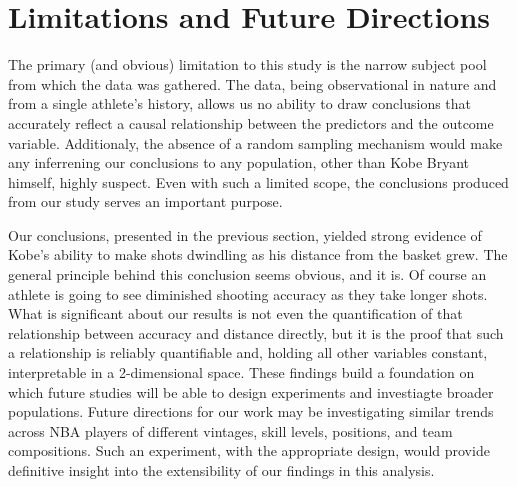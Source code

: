 \chapter{Limitations and Future Directions}\label{chap:discussion}

The primary (and obvious) limitation to this study is the narrow subject pool from which the data was gathered.  The data, being observational in nature and from a single athlete's history, allows us no ability to draw conclusions that accurately reflect a causal relationship between the predictors and the outcome variable. Additionaly, the absence of a random sampling mechanism would make any inferrening our conclusions to any population, other than Kobe Bryant himself, highly suspect.  Even with such a limited scope, the conclusions produced from our study serves an important purpose.  \par

Our conclusions, presented in the previous section, yielded strong evidence of Kobe's ability to make shots dwindling as his distance from the basket grew. The general principle behind this conclusion seems obvious, and it is.  Of course an athlete is going to see diminished shooting accuracy as they take longer shots.  What is significant about our results is not even the quantification of that relationship between accuracy and distance directly, but it is the proof that such a relationship is reliably quantifiable and, holding all other variables constant, interpretable in a 2-dimensional space.  These findings build a foundation on which future studies will be able to design experiments and investiagte broader populations. Future directions for our work may be investigating similar trends across NBA players of different vintages, skill levels, positions, and team compositions.  Such an experiment, with the appropriate design, would provide definitive insight into the extensibility of our findings in this analysis.



